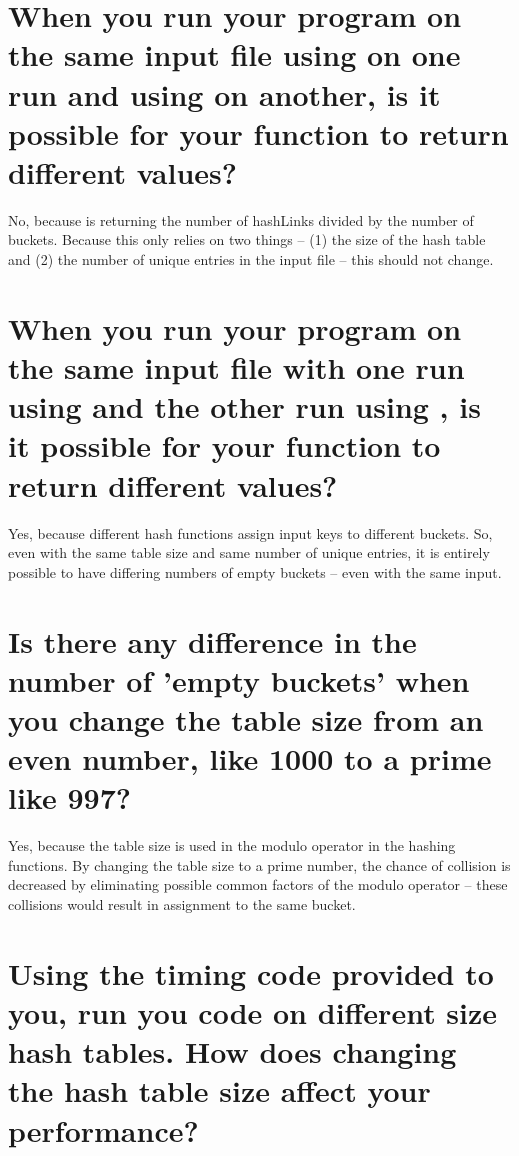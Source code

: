 \documentclass[letter,11pt]{scrartcl}
\begin{document}

\section{When you run your program on the same input file using
   on one run and using  on another,
  is it possible for your  function to return different
  values?}

No, because  is returning the number of hashLinks divided by
the number of buckets. Because this only relies on two things -- (1) the size
of the hash table and (2) the number of unique entries in the input file --
this should not change.


\section{When you run your program on the same input file with one run using
   and the other run using , is it
  possible for your  function to return different
  values?}

Yes, because different hash functions assign input keys to different
buckets. So, even with the same table size and same number of unique entries,
it is entirely possible to have differing numbers of empty buckets -- even
with the same input.


\section{Is there any difference in the number of 'empty buckets' when you
  change the table size from an even number, like 1000 to a prime like 997?}

Yes, because the table size is used in the modulo operator in the hashing
functions. By changing the table size to a prime number, the chance of
collision is decreased by eliminating possible common factors of the modulo
operator -- these collisions would result in assignment to the same bucket.


\section{Using the timing code provided to you, run you code on different size
  hash tables. How does changing the hash table size affect your performance?}
\end{document}
